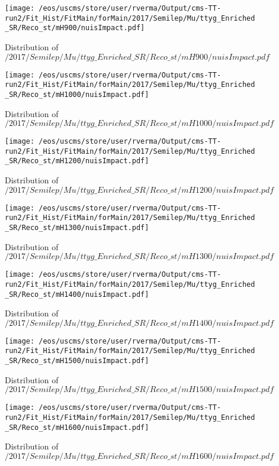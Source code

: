 \begin{figure}
\centering
\texttt{[image: /eos/uscms/store/user/rverma/Output/cms-TT-run2/Fit\_Hist/FitMain/forMain/2017/Semilep/Mu/ttyg\_Enriched\_SR/Reco\_st/mH900/nuisImpact.pdf]}
\caption{Distribution of $/2017/Semilep/Mu/ttyg\_Enriched\_SR/Reco\_st/mH900/nuisImpact.pdf$}
\end{figure}

\begin{figure}
\centering
\texttt{[image: /eos/uscms/store/user/rverma/Output/cms-TT-run2/Fit\_Hist/FitMain/forMain/2017/Semilep/Mu/ttyg\_Enriched\_SR/Reco\_st/mH1000/nuisImpact.pdf]}
\caption{Distribution of $/2017/Semilep/Mu/ttyg\_Enriched\_SR/Reco\_st/mH1000/nuisImpact.pdf$}
\end{figure}

\begin{figure}
\centering
\texttt{[image: /eos/uscms/store/user/rverma/Output/cms-TT-run2/Fit\_Hist/FitMain/forMain/2017/Semilep/Mu/ttyg\_Enriched\_SR/Reco\_st/mH1200/nuisImpact.pdf]}
\caption{Distribution of $/2017/Semilep/Mu/ttyg\_Enriched\_SR/Reco\_st/mH1200/nuisImpact.pdf$}
\end{figure}

\begin{figure}
\centering
\texttt{[image: /eos/uscms/store/user/rverma/Output/cms-TT-run2/Fit\_Hist/FitMain/forMain/2017/Semilep/Mu/ttyg\_Enriched\_SR/Reco\_st/mH1300/nuisImpact.pdf]}
\caption{Distribution of $/2017/Semilep/Mu/ttyg\_Enriched\_SR/Reco\_st/mH1300/nuisImpact.pdf$}
\end{figure}

\begin{figure}
\centering
\texttt{[image: /eos/uscms/store/user/rverma/Output/cms-TT-run2/Fit\_Hist/FitMain/forMain/2017/Semilep/Mu/ttyg\_Enriched\_SR/Reco\_st/mH1400/nuisImpact.pdf]}
\caption{Distribution of $/2017/Semilep/Mu/ttyg\_Enriched\_SR/Reco\_st/mH1400/nuisImpact.pdf$}
\end{figure}

\begin{figure}
\centering
\texttt{[image: /eos/uscms/store/user/rverma/Output/cms-TT-run2/Fit\_Hist/FitMain/forMain/2017/Semilep/Mu/ttyg\_Enriched\_SR/Reco\_st/mH1500/nuisImpact.pdf]}
\caption{Distribution of $/2017/Semilep/Mu/ttyg\_Enriched\_SR/Reco\_st/mH1500/nuisImpact.pdf$}
\end{figure}

\begin{figure}
\centering
\texttt{[image: /eos/uscms/store/user/rverma/Output/cms-TT-run2/Fit\_Hist/FitMain/forMain/2017/Semilep/Mu/ttyg\_Enriched\_SR/Reco\_st/mH1600/nuisImpact.pdf]}
\caption{Distribution of $/2017/Semilep/Mu/ttyg\_Enriched\_SR/Reco\_st/mH1600/nuisImpact.pdf$}
\end{figure}

